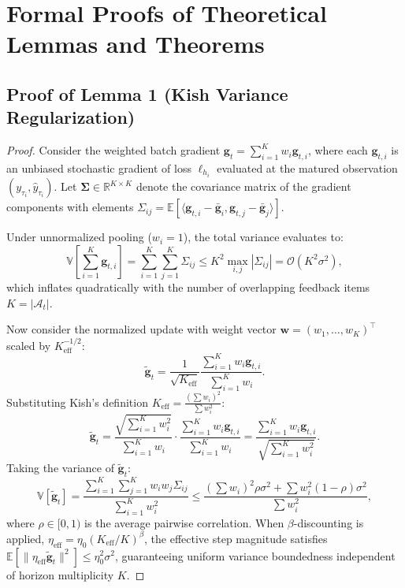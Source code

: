 \documentclass[10pt,journal,compsoc]{IEEEtran}
\begin{document}
\appendices

\section{Formal Proofs of Theoretical Lemmas and Theorems}

\subsection{Proof of Lemma 1 (Kish Variance Regularization)}
\begin{proof}
Consider the weighted batch gradient $\mathbf{g}_t = \sum_{i=1}^K w_i \mathbf{g}_{t,i}$, where each $\mathbf{g}_{t,i}$ is an unbiased stochastic gradient of loss $\ell_{h_i}$ evaluated at the matured observation $(y_{\tau_i}, \hat{y}_{\tau_i})$. Let $\mathbf{\Sigma} \in \mathbb{R}^{K \times K}$ denote the covariance matrix of the gradient components with elements $\Sigma_{ij} = \mathbb{E}[\langle \mathbf{g}_{t,i} - \bar{\mathbf{g}}_i, \mathbf{g}_{t,j} - \bar{\mathbf{g}}_j \rangle]$. 

Under unnormalized pooling ($w_i = 1$), the total variance evaluates to:
\begin{equation}
\mathbb{V}\left[\sum_{i=1}^K \mathbf{g}_{t,i}\right] = \sum_{i=1}^K \sum_{j=1}^K \Sigma_{ij} \le K^2 \max_{i,j} |\Sigma_{ij}| = \mathcal{O}(K^2 \sigma^2),
\end{equation}
which inflates quadratically with the number of overlapping feedback items $K = |\mathcal{A}_t|$.

Now consider the normalized update with weight vector $\mathbf{w} = (w_1, \dots, w_K)^\top$ scaled by $K_{\text{eff}}^{-1/2}$:
\begin{equation}
\tilde{\mathbf{g}}_t = \frac{1}{\sqrt{K_{\text{eff}}}} \frac{\sum_{i=1}^K w_i \mathbf{g}_{t,i}}{\sum_{i=1}^K w_i}.
\end{equation}
Substituting Kish's definition $K_{\text{eff}} = \frac{(\sum w_i)^2}{\sum w_i^2}$:
\begin{equation}
\tilde{\mathbf{g}}_t = \frac{\sqrt{\sum_{i=1}^K w_i^2}}{\sum_{i=1}^K w_i} \cdot \frac{\sum_{i=1}^K w_i \mathbf{g}_{t,i}}{\sum_{i=1}^K w_i} = \frac{\sum_{i=1}^K w_i \mathbf{g}_{t,i}}{\sqrt{\sum_{i=1}^K w_i^2}}.
\end{equation}
Taking the variance of $\tilde{\mathbf{g}}_t$:
\begin{equation}
\mathbb{V}[\tilde{\mathbf{g}}_t] = \frac{\sum_{i=1}^K \sum_{j=1}^K w_i w_j \Sigma_{ij}}{\sum_{i=1}^K w_i^2} \le \frac{\left(\sum w_i\right)^2 \rho \sigma^2 + \sum w_i^2 (1 - \rho) \sigma^2}{\sum w_i^2},
\end{equation}
where $\rho \in [0, 1)$ is the average pairwise correlation. When $\beta$-discounting is applied, $\eta_{\text{eff}} = \eta_0 (K_{\text{eff}} / K)^\beta$, the effective step magnitude satisfies $\mathbb{E}[\|\eta_{\text{eff}} \tilde{\mathbf{g}}_t\|^2] \le \eta_0^2 \sigma^2$, guaranteeing uniform variance boundedness independent of horizon multiplicity $K$.
\end{proof}
\end{document}
